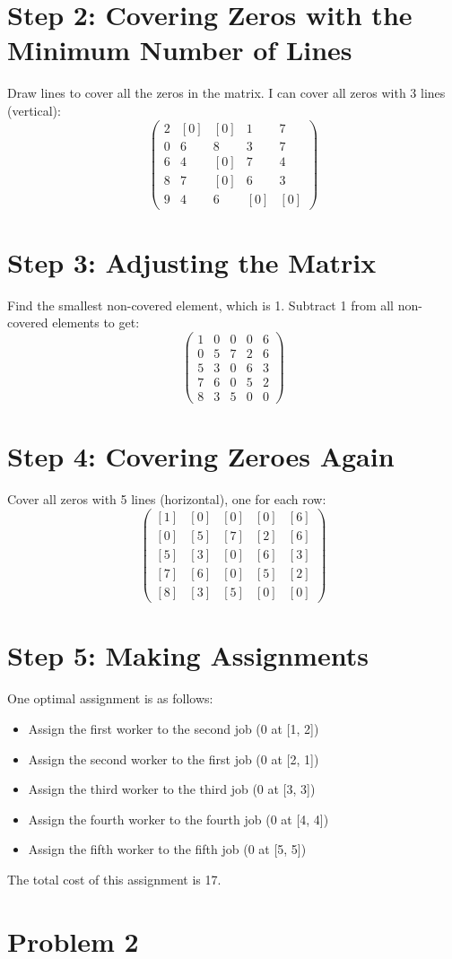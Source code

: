 \documentclass[manuscript,screen,review]{acmart}
\begin{document}
\section*{Step 2: Covering Zeros with the Minimum Number of Lines}
Draw lines to cover all the zeros in the matrix. I can cover all zeros with 3 lines (vertical):
\[
\begin{pmatrix}
2 & [0] & [0] & 1 & 7 \\
0 & 6 & 8 & 3 & 7 \\
6 & 4 & [0] & 7 & 4 \\
8 & 7 & [0] & 6 & 3 \\
9 & 4 & 6 & [0] & [0]
\end{pmatrix}
\]

\section*{Step 3: Adjusting the Matrix}
Find the smallest non-covered element, which is 1. Subtract 1 from all non-covered elements to get:
\[
\begin{pmatrix}
1 & 0 & 0 & 0 & 6 \\
0 & 5 & 7 & 2 & 6 \\
5 & 3 & 0 & 6 & 3 \\
7 & 6 & 0 & 5 & 2 \\
8 & 3 & 5 & 0 & 0
\end{pmatrix}
\]

\section*{Step 4: Covering Zeroes Again}
Cover all zeros with 5 lines (horizontal), one for each row:
\[
\begin{pmatrix}
[1] & [0] & [0] & [0] & [6] \\
[0] & [5] & [7] & [2] & [6] \\
[5] & [3] & [0] & [6] & [3] \\
[7] & [6] & [0] & [5] & [2] \\
[8] & [3] & [5] & [0] & [0]
\end{pmatrix}
\]


\section*{Step 5: Making Assignments}
One optimal assignment is as follows:
\begin{itemize}
    \item Assign the first worker to the second job (0 at [1, 2])
    \item Assign the second worker to the first job (0 at [2, 1])
    \item Assign the third worker to the third job (0 at [3, 3])
    \item Assign the fourth worker to the fourth job (0 at [4, 4])
    \item Assign the fifth worker to the fifth job (0 at [5, 5])
\end{itemize}

The total cost of this assignment is 17.

\section*{Problem 2}
\end{document}
